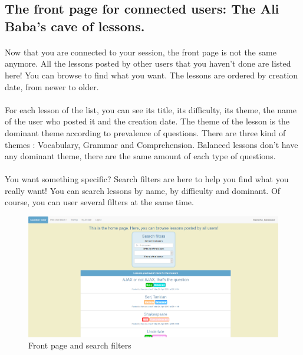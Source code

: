 \subsection{The front page for connected users: The Ali Baba's cave of lessons.}

\paragraph{}
Now that you are connected to your session, the front page is not the same anymore. All the lessons posted by other users that you haven't done are listed here! You can browse to find what you want. The lessons are ordered by creation date, from newer to older. 

\paragraph{}
For each lesson of the list, you can see its title, its difficulty, its theme, the name of the user who posted it and the creation date. The theme of the lesson is the dominant theme according to prevalence of questions. There are three kind of themes : Vocabulary, Grammar and Comprehension. Balanced lessons don't have any dominant theme, there are the same amount of each type of questions.

\paragraph{}
You want something specific? Search filters are here to help you find what you really want! You can search lessons by name, by difficulty and dominant. Of course, you can user several filters at the same time.

\begin{figure}[H]
    \includegraphics[width=1\textwidth]{./images/snapshot1.png}
    \caption{Front page and search filters}
\end{figure}

